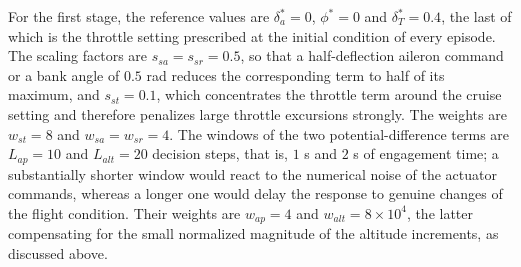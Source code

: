 \documentclass[pdflatex,sn-mathphys-num]{sn-jnl}%
\theoremstyle{thmstyleone}%
\theoremstyle{thmstyletwo}%
\theoremstyle{thmstylethree}%
\begin{document}
For the first stage, the reference values are $\delta_a^{\ast}=0$, $\phi^{\ast}=0$ and $\delta_T^{\ast}=0.4$, the last of which is the throttle setting prescribed at the initial condition of every episode. The scaling factors are $s_{sa}=s_{sr}=0.5$, so that a half-deflection aileron command or a bank angle of $0.5$ rad reduces the corresponding term to half of its maximum, and $s_{st}=0.1$, which concentrates the throttle term around the cruise setting and therefore penalizes large throttle excursions strongly. The weights are $w_{st}=8$ and $w_{sa}=w_{sr}=4$. The windows of the two potential-difference terms are $L_{ap}=10$ and $L_{alt}=20$ decision steps, that is, $1$ s and $2$ s of engagement time; a substantially shorter window would react to the numerical noise of the actuator commands, whereas a longer one would delay the response to genuine changes of the flight condition. Their weights are $w_{ap}=4$ and $w_{alt}=8\times10^{4}$, the latter compensating for the small normalized magnitude of the altitude increments, as discussed above.
\end{document}

